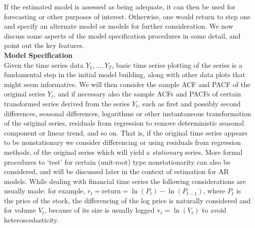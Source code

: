 If the estimated model is assessed as being adequate, it can then be used for forecasting or other purposes of interest. Otherwise, one would return to step one and specify an alternate model or models for further consideration. We now discuss some aspects of the model specification procedures in some detail, and point out the key features. \\


\noindent \textbf{Model Specification} \\


Given the time series data $Y_1,\ldots,Y_T$, basic time series  plotting of the series is a fundamental step in the initial model building, along with other data plots that might seem informative. We will then consider the sample ACF and PACF of the original series $Y_t$, and if necessary also the sample ACFs and PACFs of certain transformed series derived from the series $Y_t$, such as first and possibly second differences, seasonal differences, logarithms or other instantaneous transformation of the original series, residuals from regression to remove deterministic seasonal component or linear trend, and so on. That is, if the original time series appears to be nonstationary we consider differencing or using residuals from regression methods, of the original series which will yield a \textit{stationary} series. More formal procedures to `test' for certain (unit-root) type nonstationarity can also be considered, and will be discussed later in the context of estimation for AR models.  While dealing with financial time series the following considerations are usually made: for example, $r_t= \text{return} = \ln(P_t)-\ln(P_{t-1})$, where $P_t$ is the price of the stock, the differencing of the log price is naturally considered and for volume $V_t$, because of its size is usually logged $\text{v}_t= \ln(V_t)$ to avoid heteroscedasticity.


